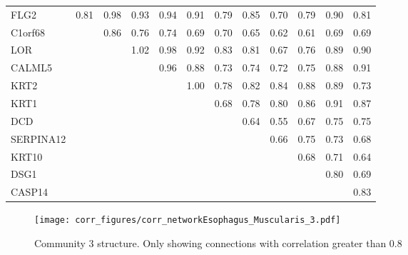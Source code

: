 \begin{longtable}{lrrrrrrrrrrr}
\bottomrule
\endlastfoot
FLG2      &          0.81 &      0.98 &         0.93 &       0.94 &       0.91 &      0.79 &            0.85 &        0.70 &       0.79 &         0.90 &         0.81 \\
C1orf68   &               &      0.86 &         0.76 &       0.74 &       0.69 &      0.70 &            0.65 &        0.62 &       0.61 &         0.69 &         0.69 \\
LOR       &               &           &         1.02 &       0.98 &       0.92 &      0.83 &            0.81 &        0.67 &       0.76 &         0.89 &         0.90 \\
CALML5    &               &           &              &       0.96 &       0.88 &      0.73 &            0.74 &        0.72 &       0.75 &         0.88 &         0.91 \\
KRT2      &               &           &              &            &       1.00 &      0.78 &            0.82 &        0.84 &       0.88 &         0.89 &         0.73 \\
KRT1      &               &           &              &            &            &      0.68 &            0.78 &        0.80 &       0.86 &         0.91 &         0.87 \\
DCD       &               &           &              &            &            &           &            0.64 &        0.55 &       0.67 &         0.75 &         0.75 \\
SERPINA12 &               &           &              &            &            &           &                 &        0.66 &       0.75 &         0.73 &         0.68 \\
KRT10     &               &           &              &            &            &           &                 &             &       0.68 &         0.71 &         0.64 \\
DSG1      &               &           &              &            &            &           &                 &             &            &         0.80 &         0.69 \\
CASP14    &               &           &              &            &            &           &                 &             &            &              &         0.83 \\
\end{longtable}


\begin{figure}[h!]
\centering
\texttt{[image: corr\_figures/corr\_networkEsophagus\_Muscularis\_3.pdf]}
\caption{Community 3 structure. Only showing connections with correlation greater than 0.8}
\end{figure}




